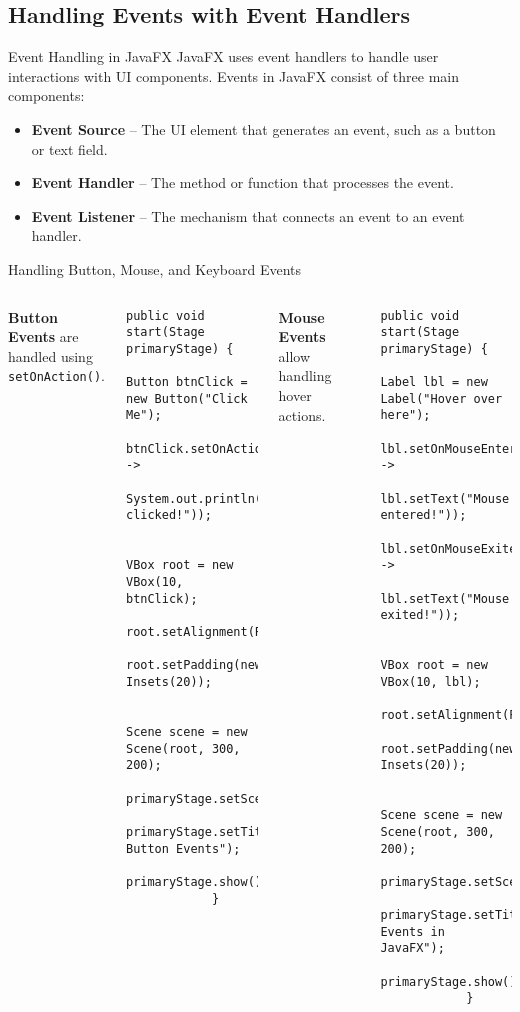 \documentclass[aspectratio=169, table]{beamer}
\begin{document}
\subsection{Handling Events with Event Handlers}

\begin{frame}[fragile]{Event Handling in JavaFX}
	\vspace{20pt}
	JavaFX uses event handlers to handle user interactions with UI components. Events in JavaFX consist of three main components:
	\begin{itemize}
		\item \textbf{Event Source} – The UI element that generates an event, such as a button or text field.
		\item \textbf{Event Handler} – The method or function that processes the event.
		\item \textbf{Event Listener} – The mechanism that connects an event to an event handler.
	\end{itemize}
\end{frame}

\begin{frame}[fragile]{Handling Button, Mouse, and Keyboard Events}
	\vspace{10pt}
	\begin{columns}[t]
		\textbf{Button Events} are handled using \texttt{setOnAction()}.
		\begin{lstlisting}[style=JavaStyle]
			public void start(Stage primaryStage) {
				Button btnClick = new Button("Click Me");
				btnClick.setOnAction(e -> 
				System.out.println("Button clicked!"));
				
				VBox root = new VBox(10, btnClick);
				root.setAlignment(Pos.CENTER);
				root.setPadding(new Insets(20));
				
				Scene scene = new Scene(root, 300, 200);
				primaryStage.setScene(scene);
				primaryStage.setTitle("Handling Button Events");
				primaryStage.show();
			}
		\end{lstlisting}
		
		\textbf{Mouse Events} allow handling hover actions.
		\begin{lstlisting}[style=JavaStyle]
			public void start(Stage primaryStage) {
				Label lbl = new Label("Hover over here");
				lbl.setOnMouseEntered(e -> 
				lbl.setText("Mouse entered!"));
				lbl.setOnMouseExited(e -> 
				lbl.setText("Mouse exited!"));
				
				VBox root = new VBox(10, lbl);
				root.setAlignment(Pos.CENTER);
				root.setPadding(new Insets(20));
				
				Scene scene = new Scene(root, 300, 200);
				primaryStage.setScene(scene);
				primaryStage.setTitle("Mouse Events in JavaFX");
				primaryStage.show();
			}
		\end{lstlisting}
	\end{columns}
\end{frame}
\end{document}
